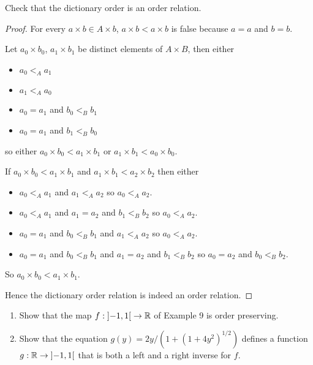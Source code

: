 \begin{exercise}\label{chapter1:section3:exercise9}
    Check that the dictionary order is an order relation.
\end{exercise}

\begin{proof}
    For every $a\times b\in A\times b$, $a\times b < a\times b$ is false because $a = a$ and $b = b$.

    Let $a_{0}\times b_{0}$, $a_{1}\times b_{1}$ be distinct elements of $A\times B$, then either
    \begin{itemize}
        \item $a_{0} <_{A} a_{1}$
        \item $a_{1} <_{A} a_{0}$
        \item $a_{0} = a_{1}$ and $b_{0} <_{B} b_{1}$
        \item $a_{0} = a_{1}$ and $b_{1} <_{B} b_{0}$
    \end{itemize}

    so either $a_{0}\times b_{0} < a_{1}\times b_{1}$ or $a_{1}\times b_{1} < a_{0}\times b_{0}$.

    If $a_{0}\times b_{0} < a_{1}\times b_{1}$ and $a_{1}\times b_{1} < a_{2}\times b_{2}$ then either
    \begin{itemize}[itemsep=0pt]
        \item $a_{0} <_{A} a_{1}$ and $a_{1} <_{A} a_{2}$ so $a_{0} <_{A} a_{2}$.
        \item $a_{0} <_{A} a_{1}$ and $a_{1} = a_{2}$ and $b_{1} <_{B} b_{2}$ so $a_{0} <_{A} a_{2}$.
        \item $a_{0} = a_{1}$ and $b_{0} <_{B} b_{1}$ and $a_{1} <_{A} a_{2}$ so $a_{0} <_{A} a_{2}$.
        \item $a_{0} = a_{1}$ and $b_{0} <_{B} b_{1}$ and $a_{1} = a_{2}$ and $b_{1} <_{B} b_{2}$ so $a_{0} = a_{2}$ and $b_{0} <_{B} b_{2}$.
    \end{itemize}

    So $a_{0}\times b_{0} < a_{1}\times b_{1}$.

    Hence the dictionary order relation is indeed an order relation.
\end{proof}

\begin{exercise}\label{chapter1:section3:exercise10}
    \begin{enumerate}[label={(\alph*)}]
        \item Show that the map $f: \left]{-1, 1}\right[\to\mathbb{R}$ of Example 9 is order preserving.
        \item Show that the equation $g(y) = 2y/\left( 1 + {(1 + 4y^{2})}^{1/2} \right)$ defines a function $g: \mathbb{R}\to \left]{-1, 1}\right[$ that is both a left and a right inverse for $f$.
    \end{enumerate}
\end{exercise}

